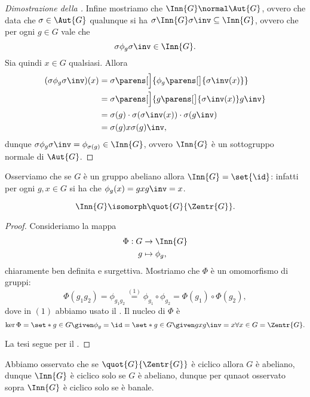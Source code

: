 \begin{proof}[Dimostrazione della ]
    Infine mostriamo che $\Inn{G} \normal \Aut{G}$, ovvero che data che $\sigma \in \Aut{G}$ qualunque si ha $\sigma\Inn{G}\sigma\inv \subseteq \Inn{G}$, ovvero che per ogni $g \in G$ vale che \[
        \sigma\phi_g\sigma\inv \in \Inn{G}.
    \] Sia quindi $x \in G$ qualsiasi. Allora \begin{align*}
        (\sigma\phi_g\sigma\inv)(x) 
        &= \sigma\parens[\Big]{\phi_g\parens[\big]{\sigma\inv(x)}}\\
        &= \sigma\parens[\Big]{g \parens[\big]{\sigma\inv(x)} g\inv} \\
        &= \sigma(g) \cdot \sigma(\sigma\inv(x)) \cdot \sigma(g\inv) \\
        &= \sigma(g) x \sigma(g)\inv,
    \end{align*} dunque $\sigma \phi_g \sigma\inv = \phi_{\sigma(g)} \in \Inn{G}$, ovvero $\Inn{G}$ è un sottogruppo normale di $\Aut{G}$.  
\end{proof}

Osserviamo che se $G$ è un gruppo abeliano allora $\Inn{G} = \set{\id}$: infatti per ogni $g, x \in G$ si ha che $\phi_g(x) = gxg\inv = x$.

\begin{proposition}
    {}{}
    \[
        \Inn{G} \isomorph \quot{G}{\Zentr{G}}.
    \]
\end{proposition}
\begin{proof}
    Consideriamo la mappa \begin{align*}
        \Phi : G &\to \Inn{G}\\
        g &\mapsto \phi_g,
    \end{align*} chiaramente ben definita e surgettiva.
     Mostriamo che $\Phi$ è un omomorfismo di gruppi: \[
        \Phi(g_1g_2) = \phi_{g_1g_2} \stackrel{(1)}{=} \phi_{g_1} \circ \phi_{g_2} = \Phi(g_1) \circ \Phi(g_2),
    \] dove in $(1)$ abbiamo usato il .
     Il nucleo di $\Phi$ è \[
        \ker \Phi = \set*{g \in G \given \phi_g = \id} = \set*{g \in G \given gxg\inv = x \forall x \in G} = \Zentr{G}.
    \] 

    La tesi segue per il .
\end{proof}

\begin{remark}
    Abbiamo osservato che se $\quot{G}{\Zentr{G}}$ è ciclico allora $G$ è abeliano, dunque $\Inn{G}$ è ciclico solo se $G$ è abeliano, dunque per qunaot osservato sopra $\Inn{G}$ è ciclico solo se è banale.
\end{remark}

